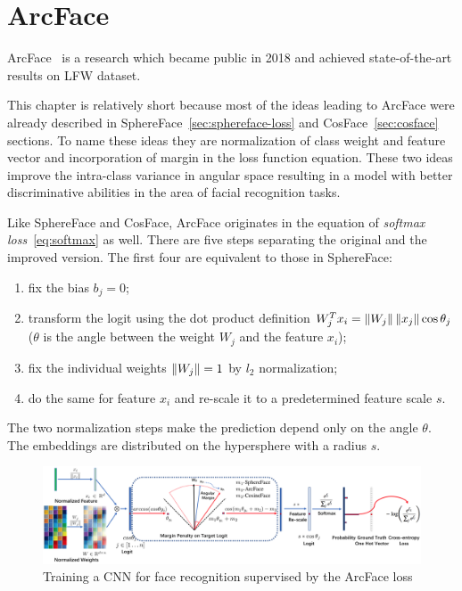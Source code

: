 \chapter{ArcFace}\label{ch:arcface}
ArcFace~\cite{ArcFace} is a research which became public in 2018 and achieved state-of-the-art results on LFW dataset.

This chapter is relatively short because most of the ideas leading to ArcFace were already described in
SphereFace~\ref{sec:sphereface-loss} and CosFace~\ref{sec:cosface} sections.
To name these ideas they are normalization of class weight and feature vector and incorporation of margin in the loss
function equation.
These two ideas improve the intra-class variance in angular space resulting in a model with better discriminative
abilities in the area of facial recognition tasks.

Like SphereFace and CosFace, ArcFace originates in the equation of \textit{softmax loss}~\ref{eq:softmax} as well.
There are five steps separating the original and the improved version.
The first four are equivalent to those in SphereFace:
\begin{enumerate}
    \item fix the bias $b_j = 0$;
    \item transform the logit using the dot product definition $W_j^T x_i = \left\lVert W_j\right\rVert \left\lVert x_j\right\rVert \cos \theta_j$
    ($\theta$ is the angle between the weight $W_j$ and the feature $x_i$);
    \item fix the individual weights $\left\lVert W_j\right\rVert = 1$ by $l_2$ normalization;
    \item do the same for feature $x_i$ and re-scale it to a predetermined feature scale $s$.
\end{enumerate}
The two normalization steps make the prediction depend only on the angle $\theta$.
The embeddings are distributed on the hypersphere with a radius $s$.

\begin{figure}[H]
    \centering
    \includegraphics[width=\columnwidth]{images/arcface/arcface.png}
    \caption{Training a CNN for face recognition supervised by the ArcFace loss~\cite{ArcFace}}
    \label{fig:arcface}
\end{figure}

